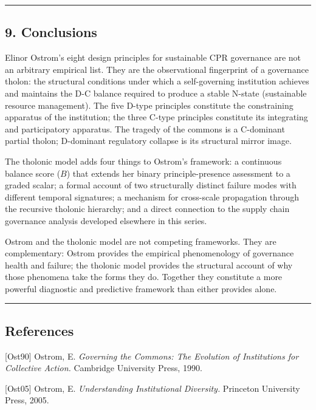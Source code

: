 \documentclass[
  11pt,
  letterpaper,
]{article}
\begin{document}
\begin{center}\rule{0.5\linewidth}{0.5pt}\end{center}

\subsection{9. Conclusions}\label{conclusions}

Elinor Ostrom's eight design principles for sustainable CPR governance
are not an arbitrary empirical list. They are the observational
fingerprint of a governance tholon: the structural conditions under
which a self-governing institution achieves and maintains the D-C
balance required to produce a stable N-state (sustainable resource
management). The five D-type principles constitute the constraining
apparatus of the institution; the three C-type principles constitute its
integrating and participatory apparatus. The tragedy of the commons is a
C-dominant partial tholon; D-dominant regulatory collapse is its
structural mirror image.

The tholonic model adds four things to Ostrom's framework: a continuous
balance score (\(B\)) that extends her binary principle-presence
assessment to a graded scalar; a formal account of two structurally
distinct failure modes with different temporal signatures; a mechanism
for cross-scale propagation through the recursive tholonic hierarchy;
and a direct connection to the supply chain governance analysis
developed elsewhere in this series.

Ostrom and the tholonic model are not competing frameworks. They are
complementary: Ostrom provides the empirical phenomenology of governance
health and failure; the tholonic model provides the structural account
of why those phenomena take the forms they do. Together they constitute
a more powerful diagnostic and predictive framework than either provides
alone.

\begin{center}\rule{0.5\linewidth}{0.5pt}\end{center}

\subsection{References}\label{references}

{[}Ost90{]} Ostrom, E. \emph{Governing the Commons: The Evolution of
Institutions for Collective Action.} Cambridge University Press, 1990.

{[}Ost05{]} Ostrom, E. \emph{Understanding Institutional Diversity.}
Princeton University Press, 2005.
\end{document}
